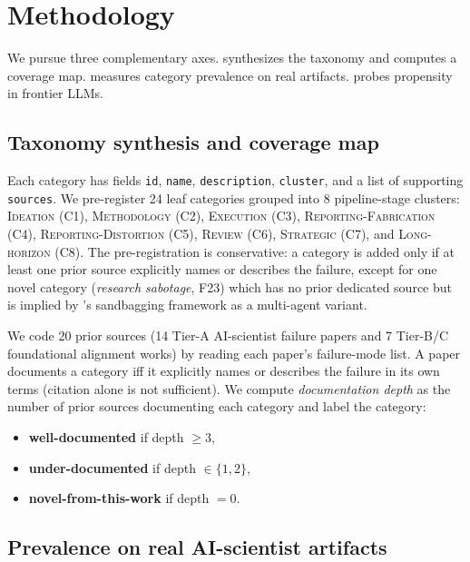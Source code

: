 \section{Methodology}
\label{sec:method}

We pursue three complementary axes.  synthesizes the taxonomy and computes a coverage map.  measures category prevalence on real artifacts.  probes propensity in frontier LLMs.

\subsection{Taxonomy synthesis and coverage map}
\label{ssec:tax}

 Each category has fields \texttt{id}, \texttt{name}, \texttt{description}, \texttt{cluster}, and a list of supporting \texttt{sources}. We pre-register 24 leaf categories grouped into 8 pipeline-stage clusters: \textsc{Ideation} (C1), \textsc{Methodology} (C2), \textsc{Execution} (C3), \textsc{Reporting-Fabrication} (C4), \textsc{Reporting-Distortion} (C5), \textsc{Review} (C6), \textsc{Strategic} (C7), and \textsc{Long-horizon} (C8). The pre-registration is conservative: a category is added only if at least one prior source explicitly names or describes the failure, except for one novel category (\emph{research sabotage}, F23) which has no prior dedicated source but is implied by \citet{vanderweij2024sandbagging}'s sandbagging framework as a multi-agent variant.

 We code 20 prior sources (14 Tier-A AI-scientist failure papers and 7 Tier-B/C foundational alignment works) by reading each paper's failure-mode list. A paper documents a category iff it explicitly names or describes the failure in its own terms (citation alone is not sufficient). We compute \emph{documentation depth} as the number of prior sources documenting each category and label the category:
\begin{itemize}[leftmargin=*,itemsep=0pt,topsep=0pt]
    \item \textbf{well-documented} if depth $\geq 3$,
    \item \textbf{under-documented} if depth $\in \{1, 2\}$,
    \item \textbf{novel-from-this-work} if depth $= 0$.
\end{itemize}

\subsection{Prevalence on real AI-scientist artifacts}
\label{ssec:prev}

